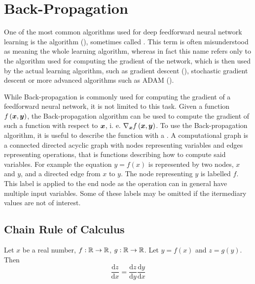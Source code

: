 \chapter{Back-Propagation}\label{backprop}

One of the most common algorithms used for deep feedforward neural network learning is the  algorithm (\cite{rumelhart_learning_1986}), sometimes called . This term is often misunderstood as meaning the whole learning algorithm, whereas in fact this name refers only to the algorithm used for computing the gradient of the network, which is then used by the actual learning algorithm, such as gradient descent (\cite{cauchy_methode_1847}), stochastic gradient descent or more advanced algorithms such as ADAM (\cite{kingma_adam:_2014}).

While Back-propagation is commonly used for computing the gradient of a feedforward neural network, it is not limited to this task. Given a function \( f \left( \bm{x}, \bm{y} \right) \), the Back-propagation algorithm can be used to compute the gradient of such a function with respect to \( \bm{x} \), i. e. \( \nabla_{\bm{x}} f \left( \bm{x}, \bm{y} \right) \). To use the Back-propagation algorithm, it is useful to describe the function with a . A computational graph is a connected directed acyclic graph with nodes representing variables and edges representing operations, that is functions describing how to compute said variables. For example the equation \( y = f \left( x \right) \) is represented by two nodes, \( x \) and \( y \), and a directed edge from \( x \) to \( y \). The node representing \( y \) is labelled \( f \). This label is applied to the end node as the operation can in general have multiple input variables. Some of these labels may be omitted if the itermediary values are not of interest.

\section{Chain Rule of Calculus}
\begin{theorem}\label{chain_rule}
	Let \( x \) be a real number, \( f : \mathbb{R} \to \mathbb{R} \), \( g : \mathbb{R} \to \mathbb{R} \). Let \( y = f \left( x \right) \) and \( z = g \left( y \right) \). Then
	\[ \frac{\mathrm{d} z}{\mathrm{d} x} = \frac{\mathrm{d} z}{\mathrm{d} y} \frac{\mathrm{d} y}{\mathrm{d} x} \]
\end{theorem}

